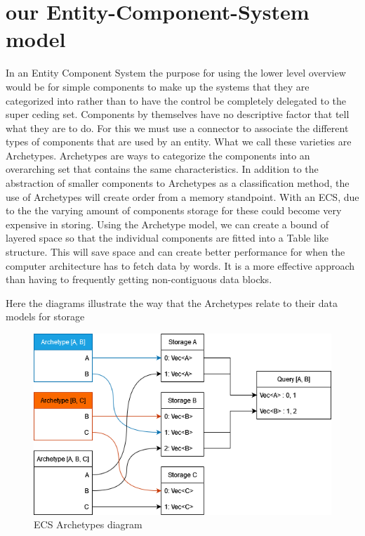 \documentclass[conference]{IEEEtran}
\begin{document}
\section{our Entity-Component-System model}


    In an Entity Component System the purpose for using the lower level overview would be for	simple components to make up the systems that they are categorized into rather than to	have the control be completely delegated to the super ceding set. Components by themselves have no descriptive factor that tell what they are to do. For this we must use a connector to associate the different types of components that are used by an entity. What we call these varieties are Archetypes. Archetypes are ways to categorize the components into an overarching set that contains the same characteristics. In addition to the abstraction of smaller components to Archetypes as a classification method, the use of Archetypes will create order from a memory standpoint. With an ECS, due to the the varying amount of components storage for these could become very expensive in storing. Using the Archetype model, we can create a bound of layered space so that the individual components are fitted into a Table like structure. This will save space and can create better performance for when the computer architecture has to fetch data by words. It is a more effective approach than having to frequently getting non-contiguous data blocks.
     
    Here the diagrams illustrate the way that the Archetypes relate to their data models for storage
    
    \begin{figure}
        \begin{center}
        \centerline{\includegraphics[scale=.43]{ECS_Diagrams.png}}
        \caption[test]{ECS Archetypes diagram}
        \label{ECS Archetype}
        \end{center}
    \end{figure}
\end{document}
